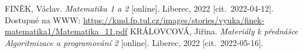 \documentclass[FM]{tulthesis}
\begin{document}
	
	
	\clearpage

	\tableofcontents	
	\listoffigures
	\listoftables
	
	
	
	
	
	
	\begin{thebibliography}{9}
		FINĚK, Václav. \emph{Matematika 1 a 2} [online]. Liberec, 2022 \mbox{[cit. 2022-04-12]}. Dostupné na WWW: \url{https://kmd.fp.tul.cz/images/stories/vyuka/finek-matematika1/Matematika_11.pdf}
		KRÁLOVCOVÁ, Jiřina. \emph{Materiály k přednášce Algoritmizace a programování 2} [online]. Liberec, 2022 \mbox{[cit. 2022-05-16]}.
	\end{thebibliography}

	\renewcommand{\appendixtocname}{Přílohy}
	\begin{appendices}
		
	\end{appendices}
\end{document}
